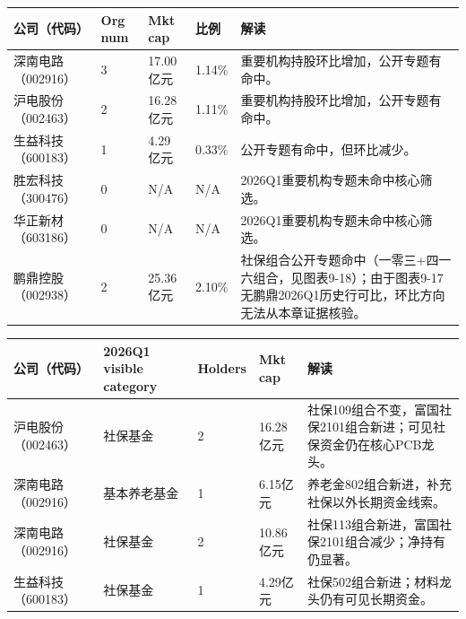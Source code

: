 \begin{exhibitbox}
\small
\begin{tabularx}{\textwidth}{L{1.8cm}R{1.5cm}R{2.2cm}R{1.7cm}X}
\toprule
\textbf{公司（代码）} & \textbf{Org num} & \textbf{Mkt cap} & \textbf{比例} & \textbf{解读} \\
\midrule
深南电路（002916） & 3 & 17.00亿元 & 1.14\% & 重要机构持股环比增加，公开专题有命中。 \\
沪电股份（002463） & 2 & 16.28亿元 & 1.11\% & 重要机构持股环比增加，公开专题有命中。 \\
生益科技（600183） & 1 & 4.29亿元 & 0.33\% & 公开专题有命中，但环比减少。 \\
胜宏科技（300476） & 0 & N/A & N/A & 2026Q1重要机构专题未命中核心筛选。 \\
华正新材（603186） & 0 & N/A & N/A & 2026Q1重要机构专题未命中核心筛选。 \\
鹏鼎控股（002938） & 2 & 25.36亿元 & 2.10\% & 社保组合公开专题命中（一零三+四一六组合，见图表9-18）；由于图表9-17无鹏鼎2026Q1历史行可比，环比方向无法从本章证据核验。 \\
\bottomrule
\end{tabularx}
\end{exhibitbox}

\begin{exhibitbox}
\footnotesize
\begin{tabularx}{\textwidth}{L{1.8cm}L{2.0cm}R{1.8cm}R{2.1cm}X}
\toprule
\textbf{公司（代码）} & \textbf{2026Q1 visible category} & \textbf{Holders} & \textbf{Mkt cap} & \textbf{解读} \\
\midrule
沪电股份（002463） & 社保基金 & 2 & 16.28亿元 & 社保109组合不变，富国社保2101组合新进；可见社保资金仍在核心PCB龙头。 \\
深南电路（002916） & 基本养老基金 & 1 & 6.15亿元 & 养老金802组合新进，补充社保以外长期资金线索。 \\
深南电路（002916） & 社保基金 & 2 & 10.86亿元 & 社保113组合新进，富国社保2101组合减少；净持有仍显著。 \\
生益科技（600183） & 社保基金 & 1 & 4.29亿元 & 社保502组合新进；材料龙头仍有可见长期资金。 \\
\bottomrule
\end{tabularx}
\end{exhibitbox}

